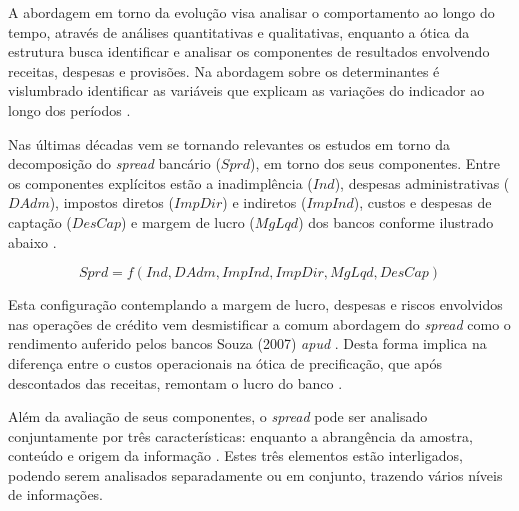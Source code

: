 \documentclass[
  12pt,
  12pt,
  openright,
  oneside,
  a4paper,
  chapter=TITLE,
  section=TITLE,
  subsection=TITLE,
  subsubsection=TITLE,
  english,
  portugues,
  sumario=tradicional]{abntex2}
\begin{document}
A abordagem em torno da evolução visa analisar o comportamento ao longo do tempo, através de análises quantitativas e qualitativas, enquanto a ótica da estrutura busca identificar e analisar os componentes de resultados envolvendo receitas, despesas e provisões. Na abordagem sobre os determinantes é vislumbrado identificar as variáveis que explicam as variações do indicador ao longo dos períodos \cite{dick:1999}.

Nas últimas décadas vem se tornando relevantes os estudos em torno da decomposição do \emph{spread} bancário (\(Sprd\)), em torno dos seus componentes. Entre os componentes explícitos estão a inadimplência (\(Ind\)), despesas administrativas (\(DAdm\)), impostos diretos (\(ImpDir\)) e indiretos (\(ImpInd\)), custos e despesas de captação (\(DesCap\)) e margem de lucro (\(MgLqd\)) dos bancos conforme ilustrado abaixo \cite{BCB:2000, BCB:1999}.

\begin{equation}
Sprd=f(Ind, DAdm, ImpInd, ImpDir, MgLqd, DesCap)
\end{equation}

Esta configuração contemplando a margem de lucro, despesas e riscos envolvidos nas operações de crédito vem desmistificar a comum abordagem do \emph{spread} como o rendimento auferido pelos bancos \cite{costa;nakane:2004} Souza (2007) \emph{apud} \cite{dantas:2012}. Desta forma implica na diferença entre o custos operacionais na ótica de precificação, que após descontados das receitas, remontam o lucro do banco \cite{BCB:2016}.

Além da avaliação de seus componentes, o \emph{spread} pode ser analisado
conjuntamente por três características: enquanto a abrangência da amostra,
conteúdo e origem da informação \cite{leal:2006}. Estes três elementos estão interligados, podendo serem analisados separadamente ou em conjunto, trazendo vários níveis de informações.
\end{document}
